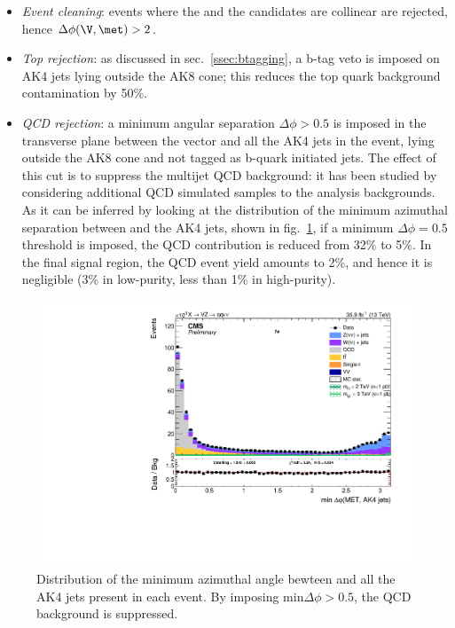 \begin{itemize}
     \item \textit{Event cleaning}: events where the \V and the \Z candidates are collinear are rejected, hence $\Delta \phi (\V,\met) > 2$.
     \item \textit{Top rejection}: as discussed in sec.~\ref{ssec:btagging}, a b-tag veto is imposed on AK4 jets lying outside the AK8 cone; this reduces the top quark background contamination by 50\%.
     \item \textit{QCD rejection}: a minimum angular separation $\Delta \phi>0.5$ is imposed in the transverse plane between the \met vector and all the AK4 jets in the event, lying outside the AK8 cone and not tagged as b-quark initiated jets. The effect of this cut is to suppress the multijet QCD background: it has been studied by considering additional QCD simulated samples to the analysis backgrounds. As it can be inferred by looking at the distribution of the minimum azimuthal separation between \met and the AK4 jets, shown in fig.~\ref{fig:QCD_cleaning}, if a minimum $\Delta \phi = 0.5$ threshold is imposed, the QCD contribution is reduced from 32\% to 5\%. In the final signal region, the QCD event yield amounts to 2\%, and hence it is negligible (3\% in low-purity, less than 1\% in high-purity).
\end{itemize}

\begin{figure}[!htb]
  \centering
    \includegraphics[width=.495\textwidth]{figures/MinJetMetDPhi.pdf}
  \caption{Distribution of the minimum azimuthal angle bewteen \met and all the AK4 jets present in each event. By imposing $\text{min} \Delta \phi > 0.5$, the QCD background is suppressed.}
  \label{fig:QCD_cleaning}
\end{figure}

\vspace*{1\baselineskip}

